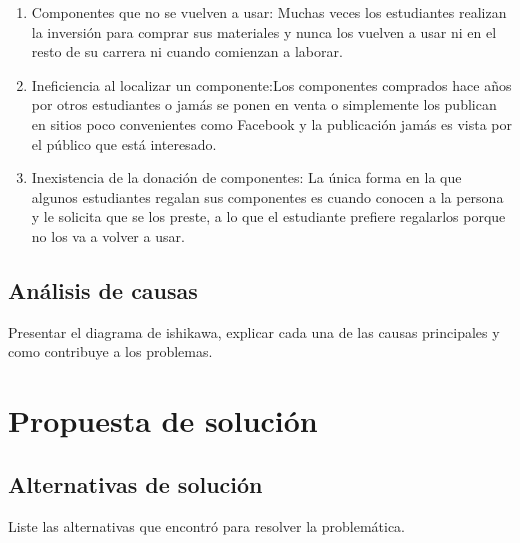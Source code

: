 \begin{enumerate}
	\item Componentes que no se vuelven a usar: Muchas veces los estudiantes realizan la inversión para comprar sus materiales y nunca los vuelven a usar ni en el resto de su carrera ni cuando comienzan a laborar.

	\item Ineficiencia al localizar un componente:Los componentes comprados hace años por otros estudiantes o jamás se ponen en venta o simplemente los publican en sitios poco convenientes como Facebook y la publicación jamás es vista por el público que está interesado.

	\item Inexistencia de la donación de componentes: La única forma en la que algunos estudiantes regalan sus componentes es cuando conocen a la persona y le solicita que se los preste, a lo que el estudiante prefiere regalarlos porque no los va a volver a usar.
\end{enumerate}

\subsection{Análisis de causas}


Presentar el diagrama de ishikawa, explicar cada una de las causas principales y como contribuye a los problemas.

\section{Propuesta de solución}

\subsection{Alternativas de solución}

Liste las alternativas que encontró para resolver la problemática.

